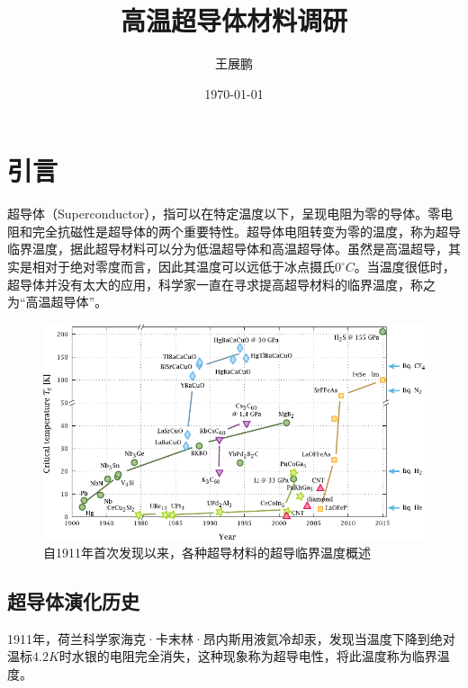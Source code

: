 \documentclass[UTF8, twocolumn]{ctexart}
\title{\fangsong 高温超导体材料调研}
\author{\kaishu 王展鹏}
\date{\today}
\begin{document}

\section{引言}

    超导体（Superconductor），指可以在特定温度以下，呈现电阻为零的导体。零电阻和完全抗磁性是超导体的两个重要特性。超导体电阻转变为零的温度，称为超导临界温度，据此超导材料可以分为低温超导体和高温超导体。虽然是高温超导，其实是相对于绝对零度而言，因此其温度可以远低于冰点摄氏$ 0 ^\circ C$。当温度很低时，超导体并没有太大的应用，科学家一直在寻求提高超导材料的临界温度，称之为“高温超导体”。

    \begin{figure}[hb]
        \centering
        \includegraphics[scale=1.2]{image/Timeline_of_Superconductivity_from_1900_to_2015.pdf}
        \caption{自1911年首次发现以来，各种超导材料的超导临界温度概述}
        \label{fig:image1}
    \end{figure}

    \subsection{超导体演化历史}
    1911年，荷兰科学家海克·卡末林·昂内斯用液氦冷却汞，发现当温度下降到绝对温标$4.2K$时水银的电阻完全消失，这种现象称为超导电性，将此温度称为临界温度。
\end{document}
